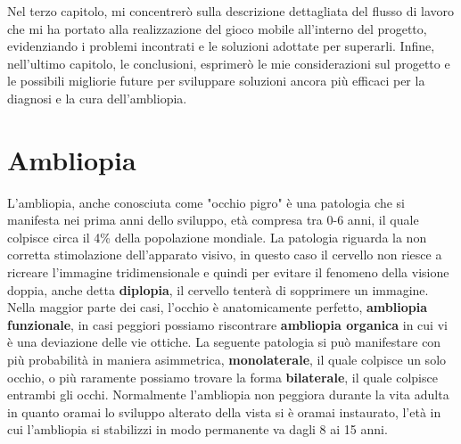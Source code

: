 \documentclass[
a4paper,
cleardoublepage=empty,
headings=twolinechapter,
numbers=autoenddot,
]{scrbook}
\begin{document}
	Nel terzo capitolo, mi concentrerò sulla descrizione dettagliata del flusso di lavoro che mi ha portato alla realizzazione del gioco mobile all'interno del progetto, evidenziando i problemi incontrati e le soluzioni adottate per superarli. Infine, nell'ultimo capitolo, le conclusioni, esprimerò le mie considerazioni sul progetto e le possibili migliorie future per sviluppare soluzioni ancora più efficaci per la diagnosi e la cura dell'ambliopia.
	 
	\chapter{Ambliopia}
	L'ambliopia, anche conosciuta come "occhio pigro" è una patologia che si manifesta nei prima anni dello sviluppo, età compresa tra 0-6 anni, il quale colpisce circa il 4\% della popolazione mondiale.
	La patologia riguarda la non corretta stimolazione dell'apparato visivo, in questo caso il cervello non riesce a ricreare l'immagine tridimensionale e quindi per evitare il fenomeno della visione doppia, anche detta \textbf{diplopia}, il cervello tenterà di sopprimere un immagine.
	Nella maggior parte dei casi, l'occhio è anatomicamente perfetto, \textbf{ambliopia funzionale}, in casi peggiori possiamo riscontrare \textbf{ambliopia organica} in cui vi è una deviazione delle vie ottiche.
	La seguente patologia si può manifestare con più probabilità in maniera asimmetrica, \textbf{monolaterale}, il quale colpisce un solo occhio, o più raramente possiamo trovare la forma \textbf{bilaterale}, il quale colpisce entrambi gli occhi.
	Normalmente l'ambliopia non peggiora durante la vita adulta in quanto oramai lo sviluppo alterato della vista si è oramai instaurato, l'età in cui l'ambliopia si stabilizzi in modo permanente va dagli 8 ai 15 anni.
\end{document}
